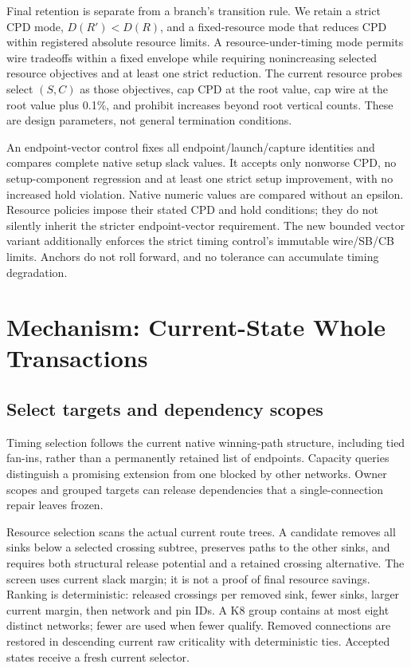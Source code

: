 \documentclass[conference,10pt]{IEEEtran}
\begin{document}
Final retention is separate from a branch's transition rule. We retain a strict CPD mode, $D(R')<D(R)$, and a fixed-resource mode that reduces CPD within registered absolute resource limits. A resource-under-timing mode permits wire tradeoffs within a fixed envelope while requiring nonincreasing selected resource objectives and at least one strict reduction. The current resource probes select $(S,C)$ as those objectives, cap CPD at the root value, cap wire at the root value plus 0.1\%, and prohibit increases beyond root vertical counts. These are design parameters, not general termination conditions.

An endpoint-vector control fixes all endpoint/launch/capture identities and compares complete native setup slack values. It accepts only nonworse CPD, no setup-component regression and at least one strict setup improvement, with no increased hold violation. Native numeric values are compared without an epsilon. Resource policies impose their stated CPD and hold conditions; they do not silently inherit the stricter endpoint-vector requirement. The new bounded vector variant additionally enforces the strict timing control's immutable wire/SB/CB limits. Anchors do not roll forward, and no tolerance can accumulate timing degradation.

\section{Mechanism: Current-State Whole Transactions}
\subsection{Select targets and dependency scopes}
Timing selection follows the current native winning-path structure, including tied fan-ins, rather than a permanently retained list of endpoints. Capacity queries distinguish a promising extension from one blocked by other networks. Owner scopes and grouped targets can release dependencies that a single-connection repair leaves frozen.

Resource selection scans the actual current route trees. A candidate removes all sinks below a selected crossing subtree, preserves paths to the other sinks, and requires both structural release potential and a retained crossing alternative. The screen uses current slack margin; it is not a proof of final resource savings. Ranking is deterministic: released crossings per removed sink, fewer sinks, larger current margin, then network and pin IDs. A K8 group contains at most eight distinct networks; fewer are used when fewer qualify. Removed connections are restored in descending current raw criticality with deterministic ties. Accepted states receive a fresh current selector.
\end{document}
